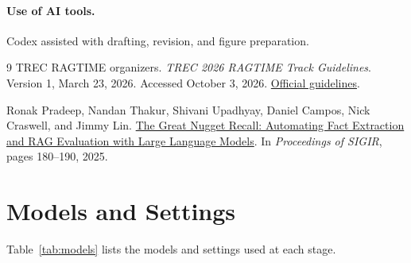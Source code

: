 \documentclass[11pt,letterpaper]{article}
\begin{document}
\paragraph{Use of AI tools.}
Codex assisted with drafting, revision, and figure preparation.

\begin{thebibliography}{9}
TREC RAGTIME organizers.
\emph{TREC 2026 RAGTIME Track Guidelines}.
Version 1, March 23, 2026. Accessed October 3, 2026.
\href{https://docs.google.com/document/d/1XqypNTHxIdazxfnUebrp-EsUuGNhodhQGrJIDnYGaB4/edit}{Official guidelines}.

Ronak Pradeep, Nandan Thakur, Shivani Upadhyay, Daniel Campos, Nick Craswell, and Jimmy Lin.
\href{https://doi.org/10.1145/3726302.3730090}{\textcolor{sea}{The Great Nugget Recall: Automating Fact Extraction and RAG Evaluation with Large Language Models}}.
In \emph{Proceedings of SIGIR}, pages 180--190, 2025.

\end{thebibliography}
\appendix
\section{Models and Settings}
\label{sec:settings}
Table~\ref{tab:models} lists the models and settings used at each stage.
\end{document}
